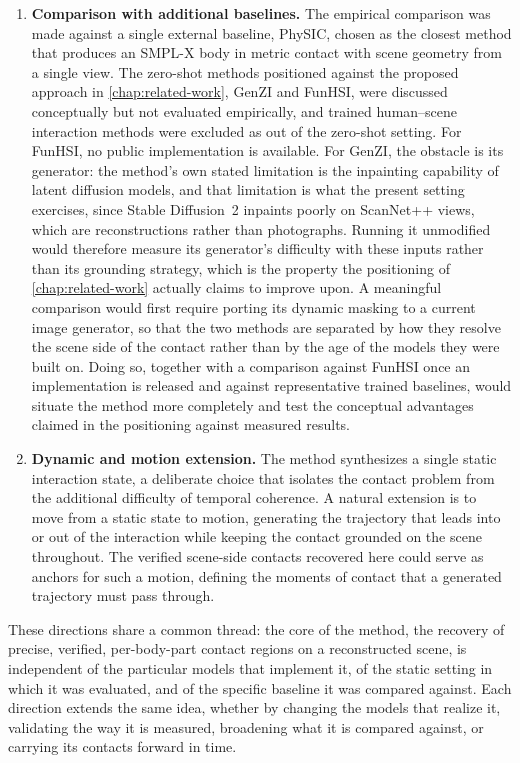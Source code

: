\begin{enumerate}
  \item \textbf{Comparison with additional baselines.} The empirical comparison was made against a single external baseline, PhySIC, chosen as the closest method that produces an SMPL-X body in metric contact with scene geometry from a single view. The zero-shot methods positioned against the proposed approach in \cref{chap:related-work}, GenZI and FunHSI, were discussed conceptually but not evaluated empirically, and trained human--scene interaction methods were excluded as out of the zero-shot setting. For FunHSI, no public implementation is available. For GenZI, the obstacle is its generator: the method's own stated limitation is the inpainting capability of latent diffusion models, and that limitation is what the present setting exercises, since Stable Diffusion~2 inpaints poorly on ScanNet++ views, which are reconstructions rather than photographs. Running it unmodified would therefore measure its generator's difficulty with these inputs rather than its grounding strategy, which is the property the positioning of \cref{chap:related-work} actually claims to improve upon. A meaningful comparison would first require porting its dynamic masking to a current image generator, so that the two methods are separated by how they resolve the scene side of the contact rather than by the age of the models they were built on. Doing so, together with a comparison against FunHSI once an implementation is released and against representative trained baselines, would situate the method more completely and test the conceptual advantages claimed in the positioning against measured results.

  \item \textbf{Dynamic and motion extension.} The method synthesizes a single static interaction state, a deliberate choice that isolates the contact problem from the additional difficulty of temporal coherence. A natural extension is to move from a static state to motion, generating the trajectory that leads into or out of the interaction while keeping the contact grounded on the scene throughout. The verified scene-side contacts recovered here could serve as anchors for such a motion, defining the moments of contact that a generated trajectory must pass through.
\end{enumerate}

These directions share a common thread: the core of the method, the recovery of precise, verified, per-body-part contact regions on a reconstructed scene, is independent of the particular models that implement it, of the static setting in which it was evaluated, and of the specific baseline it was compared against. Each direction extends the same idea, whether by changing the models that realize it, validating the way it is measured, broadening what it is compared against, or carrying its contacts forward in time.

